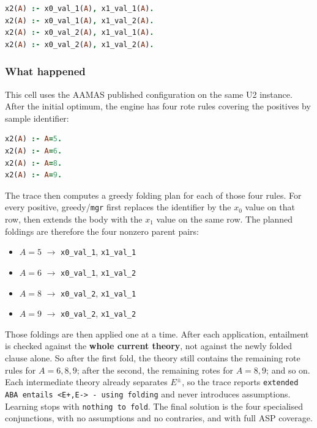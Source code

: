 \documentclass[11pt]{article}
\begin{document}
\begin{lstlisting}[style=logic,language=Prolog]
x2(A) :- x0_val_1(A), x1_val_1(A).
x2(A) :- x0_val_1(A), x1_val_2(A).
x2(A) :- x0_val_2(A), x1_val_1(A).
x2(A) :- x0_val_2(A), x1_val_2(A).
\end{lstlisting}

\subsubsection{What happened}

This cell uses the AAMAS published configuration on the same U2 instance. After the initial optimum, the engine has four rote rules covering the positives by sample identifier:

\begin{lstlisting}[style=logic,language=Prolog]
x2(A) :- A=5.
x2(A) :- A=6.
x2(A) :- A=8.
x2(A) :- A=9.
\end{lstlisting}

The trace then computes a greedy folding plan for each of those four rules. For every positive, greedy/\texttt{mgr} first replaces the identifier by the \(x_0\) value on that row, then extends the body with the \(x_1\) value on the same row. The planned foldings are therefore the four nonzero parent pairs:

\begin{itemize}
  \item \(A=5\) \(\rightarrow\) \texttt{x0\_val\_1}, \texttt{x1\_val\_1}
  \item \(A=6\) \(\rightarrow\) \texttt{x0\_val\_1}, \texttt{x1\_val\_2}
  \item \(A=8\) \(\rightarrow\) \texttt{x0\_val\_2}, \texttt{x1\_val\_1}
  \item \(A=9\) \(\rightarrow\) \texttt{x0\_val\_2}, \texttt{x1\_val\_2}
\end{itemize}

Those foldings are then applied one at a time. After each application, entailment is checked against the \textbf{whole current theory}, not against the newly folded clause alone. So after the first fold, the theory still contains the remaining rote rules for \(A=6,8,9\); after the second, the remaining rotes for \(A=8,9\); and so on. Each intermediate theory already separates \(E^\pm\), so the trace reports \texttt{extended ABA entails <E+,E-> - using folding} and never introduces assumptions. Learning stops with \texttt{nothing to fold}. The final solution is the four specialised conjunctions, with no assumptions and no contraries, and with full ASP coverage.
\end{document}
